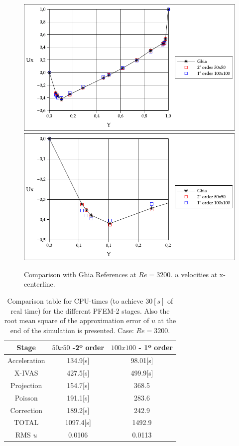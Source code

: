 \documentclass[a4paper,conference]{IEEEtran}
\begin{document}
\begin{figure}[htbp]
  \begin{center}
      \includegraphics[width=.85\linewidth]{images/Re_3200_Ux_v2.pdf}
      \includegraphics[width=.85\linewidth]{images/Re_3200_Ux_v2_zoom.pdf}
  \end{center}
  \caption{\label{fg:Re3200} Comparison with Ghia References at $Re=3200$. $u$ velocities at x-centerline.}
\end{figure}

\begin{table}[htbp]
\begin{center}
{\footnotesize
\begin{tabular}[h]{||c|c|c||}
    \hline
      Stage & $50x50$  -2º order & $100x100$ - 1º order\\
      \hline
      \hline
	Acceleration & 134.9[s]& 98.01[s]\\
	X-IVAS & 427.5[s]& 499.9[s] \\
	Projection & 154.7[s]& 368.5\\
	Poisson & 191.1[s]& 283.6\\
	Correction & 189.2[s]& 242.9\\
      \hline
	TOTAL & 1097.4[s]& 1492.9\\
      \hline
      \hline
	RMS $u$ & 0.0106 & 0.0113 \\
      \hline
      \hline
\end{tabular}
}
\caption{\label{Tabla:times_Re_3200} Comparison table for CPU-times (to achieve $30[s]$ of real time) for the different PFEM-2 stages. Also the root mean square of the approximation error of $u$ at the end of the simulation is presented. Case: $Re=3200$.}
\end{center}
\end{table}
\end{document}
